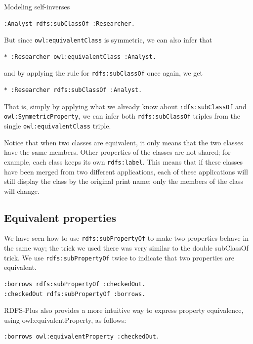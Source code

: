 \begin{challenge}{Modeling self-inverses}
\begin{lstlisting}
:Analyst rdfs:subClassOf :Researcher.
\end{lstlisting}

But since \texttt{owl:equivalentClass} is symmetric, we can also infer that

\begin{lstlisting}
* :Researcher owl:equivalentClass :Analyst.
\end{lstlisting}

and by applying the rule for \texttt{rdfs:subClassOf} once again, we get

\begin{lstlisting}
* :Researcher rdfs:subClassOf :Analyst.
\end{lstlisting}

That is, simply by applying what we already know about \texttt{rdfs:subClassOf}
and \texttt{owl:SymmetricProperty}, we can infer both \texttt{rdfs:subClassOf} triples
from the single \texttt{owl:equivalentClass} triple.

Notice that when two classes are equivalent, it only means that the two
classes have the same members. Other properties of the classes are not
shared; for example, each class keeps its own
\texttt{rdfs:label}. This means that if these classes have been merged from two
different applications, each of these applications will still display
the class by the original print name; only the members of the class will
change.

\subsection{Equivalent properties}

We have seen how to use \texttt{rdfs:subPropertyOf} to make two properties behave
in the same way; the trick we used there was very similar to the double
subClassOf trick. We use \texttt{rdfs:subPropertyOf} twice to indicate that two
properties are equivalent.

\begin{lstlisting}
:borrows rdfs:subPropertyOf :checkedOut.
:checkedOut rdfs:subPropertyOf :borrows.
\end{lstlisting}

RDFS-Plus also provides a more intuitive way to express property
equivalence, using
owl:equivalentProperty, as follows:

\begin{lstlisting}
:borrows owl:equivalentProperty :checkedOut.
\end{lstlisting}


\end{challenge}

